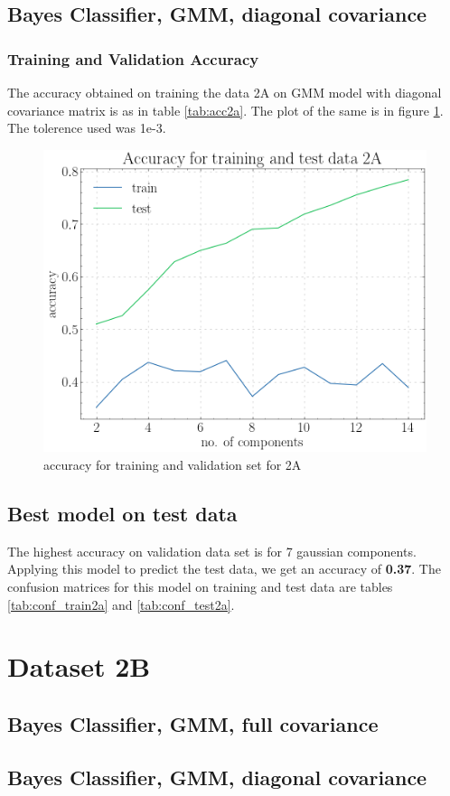 \documentclass[11pt,a4paper]{article}
\begin{document}
\subsection{Bayes Classifier, GMM, diagonal covariance}
\subsubsection{Training and Validation Accuracy}
The accuracy obtained on training the data 2A on GMM model with diagonal covariance matrix is as in table \ref{tab:acc2a}. The plot of the same is in figure \ref{fig:acc2adiag}. The tolerence used was 1e-3.

\begin{figure}
    \centering
    \includegraphics[scale = 0.5]{acc_2a.png}
    \caption{accuracy for training and validation set for 2A}
    \label{fig:acc2adiag}
\end{figure}
\subsection{Best model on test data}
The highest accuracy on validation data set is for 7 gaussian components. Applying this model to predict the test data, we get an accuracy of \textbf{0.37}. The confusion matrices for this model on training and test data are tables \ref{tab:conf_train2a} and \ref{tab:conf_test2a}.


\break
\section{Dataset 2B}
\subsection{Bayes Classifier, GMM, full covariance}
\subsection{Bayes Classifier, GMM, diagonal covariance}
\end{document}
